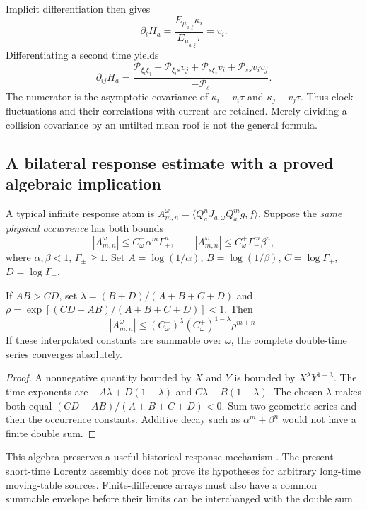 Implicit differentiation then gives
\[
 \partial_iH_a=\frac{E_{\mu_{a,\xi}}\kappa_i}{E_{\mu_{a,\xi}}\tau}=v_i.
\]
Differentiating a second time yields
\begin{equation}
 \partial_{ij}H_a
 =\frac{\mathcal P_{\xi_i\xi_j}+\mathcal P_{\xi_i s}v_j
 +\mathcal P_{s\xi_j}v_i+\mathcal P_{ss}v_iv_j}
 {-\mathcal P_s}.
 \label{eq:physical-Hessian}
\end{equation}
The numerator is the asymptotic covariance of
$\kappa_i-v_i\tau$ and $\kappa_j-v_j\tau$. Thus clock fluctuations and their correlations with current are retained. Merely dividing a collision covariance by an untilted mean roof is not the general formula.

\subsection{A bilateral response estimate with a proved algebraic implication}
A typical infinite response atom is
$A_{m,n}^\omega=\langle Q_a^nJ_{a,\omega}Q_a^mg,f\rangle$.
Suppose the \emph{same physical occurrence} has both bounds
\[
 |A_{m,n}^\omega|\le C^-_\omega\alpha^m\Gamma_+^n,
 \qquad |A_{m,n}^\omega|\le C^+_\omega\Gamma_-^m\beta^n,
\]
where $\alpha,\beta<1$, $\Gamma_\pm\ge1$. Set
$A=\log(1/\alpha)$, $B=\log(1/\beta)$, $C=\log\Gamma_+$, $D=\log\Gamma_-$.

\begin{proposition}\label{prop:bilateral}
If $AB>CD$, set $\lambda=(B+D)/(A+B+C+D)$ and
$\rho=\exp[(CD-AB)/(A+B+C+D)]<1$. Then
\[
 |A_{m,n}^\omega|\le(C^-_\omega)^\lambda(C^+_\omega)^{1-\lambda}\rho^{m+n}.
\]
If these interpolated constants are summable over $\omega$, the complete double-time series converges absolutely.
\end{proposition}
\begin{proof}
A nonnegative quantity bounded by $X$ and $Y$ is bounded by $X^\lambda Y^{1-\lambda}$. The time exponents are $-A\lambda+D(1-\lambda)$ and $C\lambda-B(1-\lambda)$. The chosen $\lambda$ makes both equal $(CD-AB)/(A+B+C+D)<0$. Sum two geometric series and then the occurrence constants. Additive decay such as $\alpha^m+\beta^n$ would not have a finite double sum.
\end{proof}

This algebra preserves a useful historical response mechanism \cite{RepoCM2}. The present short-time Lorentz assembly does not prove its hypotheses for arbitrary long-time moving-table sources. Finite-difference arrays must also have a common summable envelope before their limits can be interchanged with the double sum.

